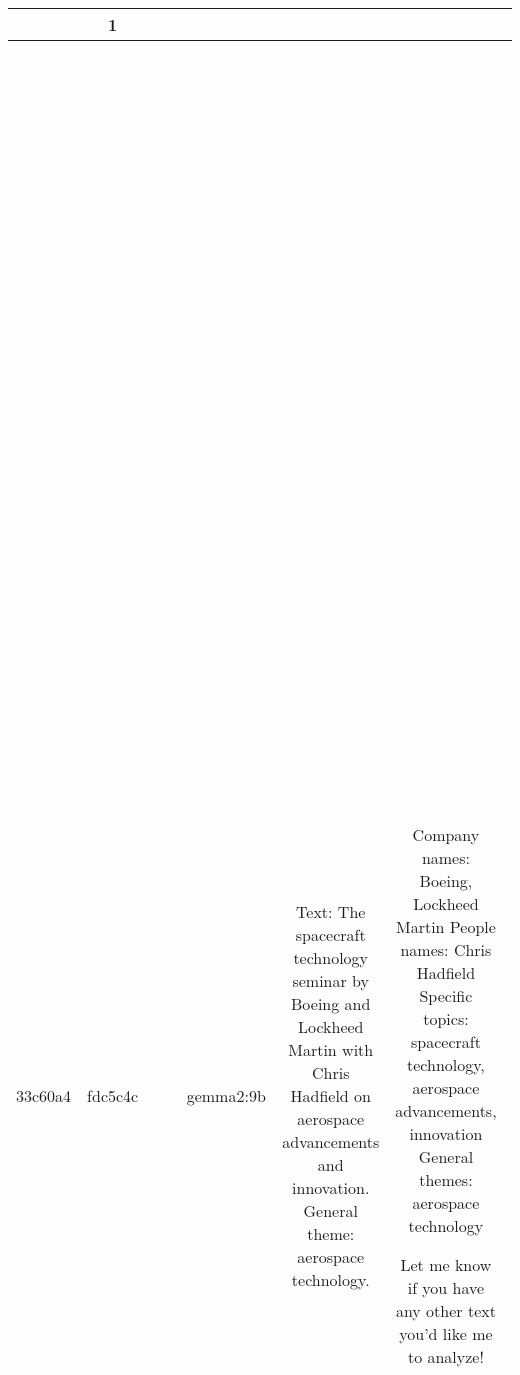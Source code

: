 \begin{table}[h!]
\begin{tabular}{|c|c|c|c|c|c|c|c|c|c|}
{ERR & 1\\
\hline
33c60a4 & fdc5c4c &  &  & gemma2:9b & Text: The spacecraft technology seminar by Boeing and Lockheed Martin with Chris Hadfield on aerospace advancements and innovation. General theme: aerospace technology. & Company names: Boeing, Lockheed Martin 
People names: Chris Hadfield  
Specific topics: spacecraft technology, aerospace advancements, innovation 
General themes: aerospace technology 


Let me know if you have any other text you'd like me to analyze!  
 & ok & The chatbot output follows the description's desired format. Here's my evaluation:

1. The chatbot organizes the extracted information in the specified categories: "Company names," "People names," "Specific topics," and "General themes."
2. The format aligns with the required comma-separated list for company names and people names, and the lists provided for specific topics and general themes fall in line with the desired format.
3. There is a surplus statement at the end, "Let me know if you have any other text you'd like me to analyze!" which is not explicitly required by the description, but this doesn't impact the compliance with the essential elements of the desired format.

Thus, based on the information provided, the primary fields are presented correctly under the specified format, confirming compliance with the guidelines. The extra line doesn't disrupt the compliance regarding the extraction task.

OK & 1\\
\hline
6af6709 & fdc5c4c &  &  & llama3.2:1b & Text: At the journalism forum organized by The Times and Reuters, reporters like Bob Woodward discussed media ethics and reporting standards. General theme: media and journalism. & Here are the extracted elements of text:

**Company Names:** The Times, Reuters
**People Names:** 
  - Bob Woodward (reporter)
**Specific Topics:** 
  - Media ethics
  - Reporting standards
**General Themes:** 
  - Media and Journalism & ok & The chatbot's output is structured in accordance with the desired format specified in the description. The format calls for listing extracted elements under clear headings: Company names, People names, Specific topics, and General themes. 

1. **Company Names**: The output lists company names ("The Times, Reuters") in a comma-separated format, complying with the required format.
2. **People Names**: The output lists a person's name ("Bob Woodward") in a bullet point format. While the bullet format deviates from the exact comma-separated list mentioned in the description, it still distinctly identifies the people names in a list form, which can be deemed as acceptable given the flexible interpretation of listing formats.
3. **Specific Topics**: The specific topics ("Media ethics", "Reporting standards") are correctly listed in a bullet-point format.
4. **General Themes**: The general theme ("Media and Journalism") is also listed correctly under this heading.

}
\end{tabular}
\end{table}
